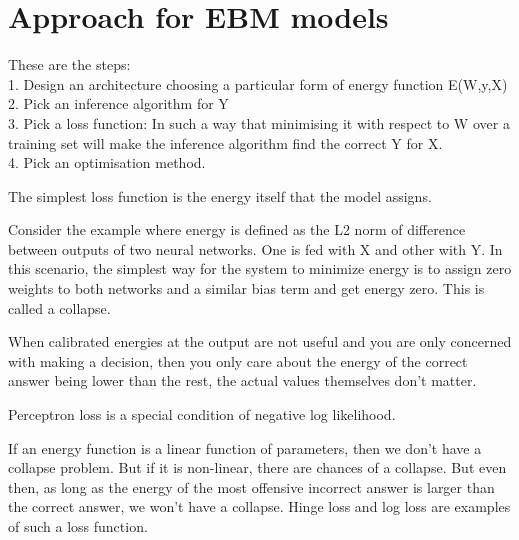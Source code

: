 \section{Approach for EBM models}
These are the steps: \\
1. Design an architecture choosing a particular form of energy function E(W,y,X) \\
2. Pick an inference algorithm for Y \\
3. Pick a loss function: In such a way that minimising it with respect to W over a training set will make the inference algorithm find the correct Y for X.\\
4. Pick an optimisation method.

The simplest loss function is the energy itself that the model assigns. 

Consider the example where energy is defined as the L2 norm of difference between outputs of two neural networks. One is fed with X and other with Y. In this scenario, the simplest way for the system to minimize energy is to assign zero weights to both networks and a similar bias term and get energy zero. This is called a collapse.

When calibrated energies at the output are not useful and you are only concerned with making a decision, then you only care about the energy of the correct answer being lower than the rest, the actual values themselves don't matter.

Perceptron loss is a special condition of negative log likelihood.

If an energy function is a linear function of parameters, then we don't have a collapse problem. But if it is non-linear, there are chances of a collapse.
But even then, as long as  the energy of the most offensive incorrect answer is larger than the correct answer, we won't have a collapse. Hinge loss and log loss are examples of such a loss function. 

